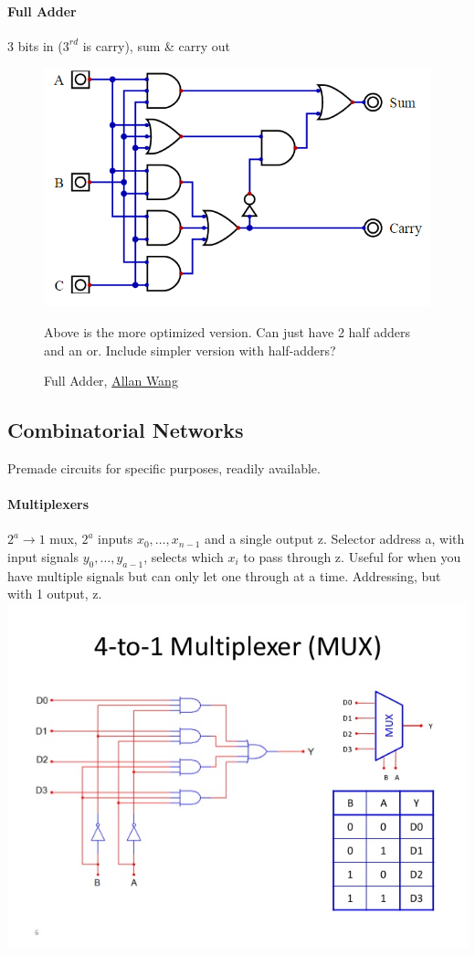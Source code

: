 \documentclass[12 pt]{article}
\begin{document}
	\paragraph{Full Adder} 3 bits in ($3^{rd}$ is carry), sum \& carry out
	\begin{figure}[H]
		\caption{Full Adder, \href{https://www.allanwang.ca/notes/mcgill/comp273/0.php}{Allan Wang}}
		\begin{center}
			\includegraphics{fa}
		\end{center}
		Above is the more optimized version. Can just have 2 half adders and an or. Include simpler version with half-adders?
	\end{figure}
	\subsection{Combinatorial Networks} Premade circuits for specific purposes, readily available.
	\paragraph{Multiplexers} $2^a \to 1$ mux, $2^a$ inputs $x_0,\ldots,x_{n-1}$ and a single output z. Selector address a, with input signals $y_0,\ldots,y_{a-1}$, selects which $x_i$ to pass through z. Useful for when you have multiple signals but can only let one through at a time. Addressing, but with 1 output, z. \\\includegraphics[scale=0.5]{multi}
\end{document}
